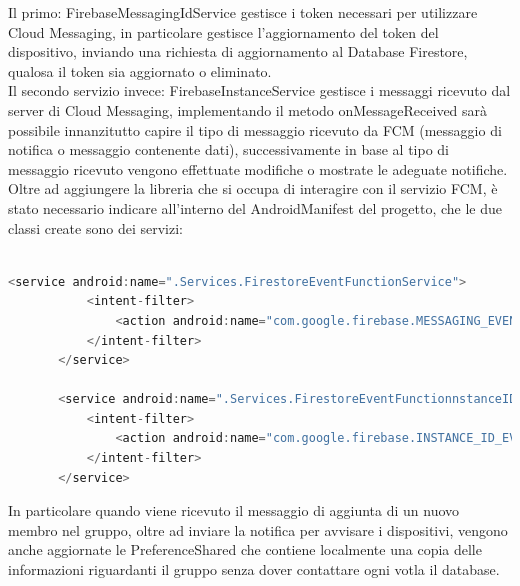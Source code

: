 Il primo: FirebaseMessagingIdService gestisce i token necessari per utilizzare Cloud Messaging, in particolare gestisce l'aggiornamento del token del dispositivo, inviando una richiesta di aggiornamento al Database Firestore, qualosa il token sia aggiornato o eliminato.\\
Il secondo servizio invece: FirebaseInstanceService gestisce i messaggi ricevuto dal server di Cloud Messaging, implementando il metodo onMessageReceived sarà possibile innanzitutto capire il tipo di messaggio ricevuto da FCM (messaggio di notifica o messaggio contenente dati), successivamente in base al tipo di messaggio ricevuto vengono effettuate modifiche o mostrate le adeguate notifiche.\\
Oltre ad aggiungere la libreria che si occupa di interagire con il servizio FCM, è stato necessario indicare all'interno del AndroidManifest del progetto, che le due classi create sono dei servizi:
\begin{lstlisting}[language=kotlin,caption={Android Manifest - I servizi FCM}]

<service android:name=".Services.FirestoreEventFunctionService">
           <intent-filter>
               <action android:name="com.google.firebase.MESSAGING_EVENT" />
           </intent-filter>
       </service>

       <service android:name=".Services.FirestoreEventFunctionnstanceIDService">
           <intent-filter>
               <action android:name="com.google.firebase.INSTANCE_ID_EVENT" />
           </intent-filter>
       </service>

       \end{lstlisting}
In particolare quando viene ricevuto il messaggio di aggiunta di un nuovo membro nel gruppo, oltre ad inviare la notifica per avvisare i dispositivi, vengono anche aggiornate le PreferenceShared che contiene localmente una copia delle informazioni riguardanti il gruppo senza dover contattare ogni votla il database.\\

